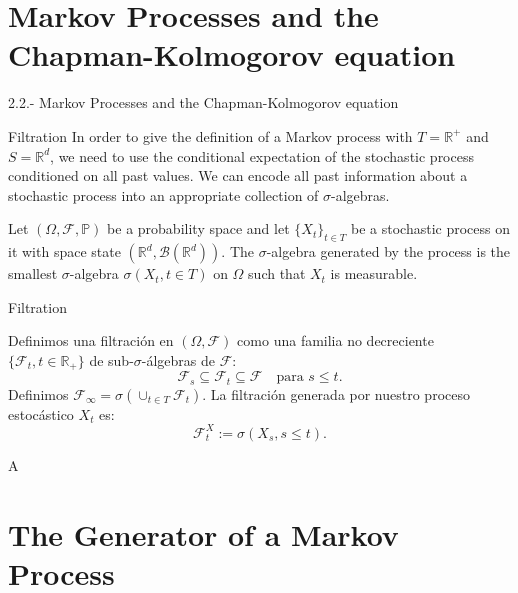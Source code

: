\documentclass[aspectratio=169,xcolor=dvipsnames]{beamer}
\begin{document}
\section{Markov Processes and the Chapman-Kolmogorov equation}

\begin{frame}
    \centering
    \Huge{2.2.- Markov Processes and the Chapman-Kolmogorov equation}
\end{frame}


\begin{frame}{Filtration}
    In order to give the definition of a Markov process with $T=\mathbb{R}^+$ and $S=\mathbb{R}^d$, we need to use the conditional expectation of the stochastic process conditioned on all past values. We can encode all past information about a stochastic process into an appropriate collection of $\sigma$-algebras.

    \begin{definition}
        Let $(\Omega, \mathcal{F}, \mathbb{P})$ be a probability space and let $\{X_t\}_{t \in T}$ be a stochastic process on it with space state $(\mathbb{R}^d, \mathcal{B}(\mathbb{R}^d))$. The $\sigma$-algebra generated by the process is the smallest $\sigma$-algebra $\sigma(X_t, t \in T)$ on $\Omega$ such that $X_t$ is measurable.
    \end{definition}
\end{frame}

\begin{frame}{Filtration}
    \begin{definition}[Filtration]
        Definimos una filtración en $(\Omega,\mathcal{F})$ como una familia no decreciente $\{\mathcal{F}_t, t \in \mathbb{R}_+\}$ de sub-$\sigma$-álgebras de $\mathcal{F}$:
        $$
        \mathcal{F}_s \subseteq \mathcal{F}_t \subseteq \mathcal{F} \quad \text{para } s \leq t.
        $$
        Definimos $\mathcal{F}_\infty = \sigma(\cup_{t\in T}\mathcal{F}_t)$. La filtración generada por nuestro proceso estocástico $X_t$ es:
        $$
        \mathcal{F}_t^X := \sigma(X_s, s \leq t).
        $$
    \end{definition}
    A
\end{frame}

\section{The Generator of a Markov Process}
\end{document}
